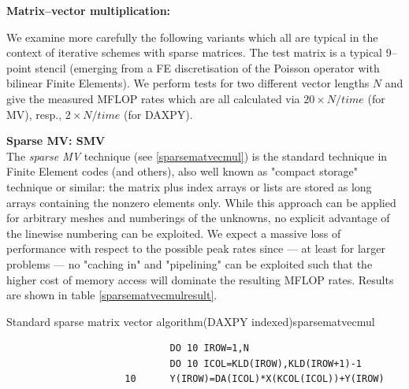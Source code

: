 {\bf Matrix--vector multiplication:}

We examine more carefully the following variants which all are typical in the context of 
iterative schemes with sparse matrices. The test matrix is a 
typical 9--point stencil (emerging from a FE discretisation of the Poisson operator with bilinear Finite 
Elements). We perform tests for two different vector lengths $N$ and give the measured MFLOP rates which are all calculated via $20 \times N/time$ (for MV), resp., 
$2 \times N/time$ (for DAXPY). 

{\bf Sparse MV: SMV}\\
The {\em sparse MV} technique (see \ref{sparsematvecmul}) is the standard technique in Finite Element codes (and others), also well known 
as "compact storage" technique or similar: the matrix plus index arrays or lists are stored as long arrays 
containing the nonzero elements only. While this approach can be applied for arbitrary meshes and 
numberings of the unknowns, no explicit advantage of the linewise numbering can be 
exploited. We expect a massive loss of performance with respect to the possible peak rates since --- at least 
for larger problems --- no "caching in" and "pipelining" can be exploited such that the higher cost of 
memory access will dominate the resulting MFLOP rates. Results are shown in table \ref{sparsematvecmulresult}.



\begin{code}{ Standard sparse matrix vector algorithm(DAXPY indexed)}{sparsematvecmul}
\begin{verbatim}
                             DO 10 IROW=1,N
                             DO 10 ICOL=KLD(IROW),KLD(IROW+1)-1
                     10      Y(IROW)=DA(ICOL)*X(KCOL(ICOL))+Y(IROW)
\end{verbatim}
\end{code}

